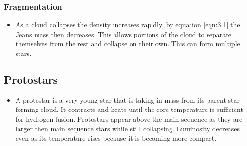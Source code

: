 \documentclass[11pt]{article}
\numberwithin{equation}{section}
\begin{document}
\subsubsection{Fragmentation }
\begin{itemize}
    \item As a cloud collapses the density increases rapidly, by equation \ref{eqn:3.1} the Jeans mass then decreases. This allows portions of the cloud to separate themselves from the rest and collapse on their own. This can form multiple stars. 
\end{itemize}

\subsection{Protostars }
\begin{itemize}
    \item A protostar is a very young star that is taking in mass from its parent star-forming cloud. It contracts and heats until the core temperature is sufficient for hydrogen fusion.  Protostars appear above the main sequence as they are larger then main sequence stars while still collapsing. Luminosity decreases even as its temperature rises because it is becoming more compact. 
\end{itemize}
\end{document}
